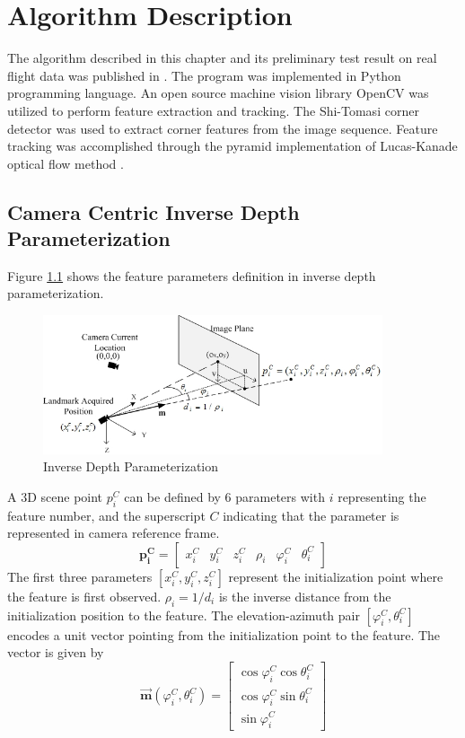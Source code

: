 \chapter{Algorithm Description}\label{ch:algorithm}

The algorithm described in this chapter and its preliminary test
result on real flight data was published in
\cite{zhang_obstacle_2012}. The program was implemented in Python
programming language\cite{_python_????}. An open source machine
vision library OpenCV\cite{_opencv_????} was utilized to perform feature extraction and
tracking. The Shi-Tomasi corner detector \cite{shi_good_1994} was used
to extract corner features from the image sequence. Feature tracking
was accomplished through the pyramid implementation of Lucas-Kanade
optical flow method \cite{bouguet_pyramidal_1999}.

\section{Camera Centric Inverse Depth Parameterization}
Figure \ref{fig:algo1} shows the feature parameters definition in inverse
depth parameterization.

\begin{figure}[h]
\centering
\includegraphics[width=10cm, keepaspectratio=true]{./Figures/idp.jpg}
\caption{Inverse Depth Parameterization}
\label{fig:algo1}
\end{figure}

\noindent A 3D scene point $p_{i}^{C}$ can be defined by 6 parameters
with $i$ representing the feature number, and the superscript $C$
indicating that the parameter is represented in camera reference frame.
\begin{equation}
\mathbf{p_{i}^{C}}=\begin{bmatrix}
x_{i}^{C} & y_{i}^{C} & z_{i}^{C} & \rho _{i} & \varphi _{i}^{C} & 
\theta _{i}^{C} 
\end{bmatrix}
\end{equation}
The first three parameters $[x_{i}^{C}, y_{i}^{C}, z_{i}^{C}]$
represent the initialization point where the feature is first observed.
$\rho_{i} = 1/d_i$ is the inverse distance from the initialization position
to the feature. The elevation-azimuth pair $[\varphi_{i}^{C},
\theta_{i}^{C}]$ encodes a unit vector pointing from the
initialization point to the feature. The vector is given by
\begin{equation}
\label{eq:m}
\vec{\mathbf{m}}(\varphi_{i}^{C}, \theta_{i}^{C})=\begin{bmatrix}
\cos\varphi_{i}^{C}\cos\theta _{i}^{C} \\
\cos\varphi_{i}^{C}\sin\theta _{i}^{C} \\
\sin\varphi_{i}^{C}
\end{bmatrix}
\end{equation}


